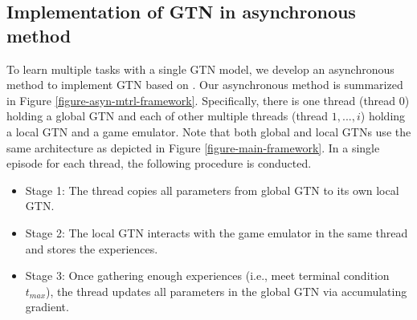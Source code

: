 \documentclass[letterpaper]{article} %
\begin{document}
\subsection{Implementation of GTN in asynchronous method}
\label{section-asyn-mtrl-framework}


To learn multiple tasks with a single GTN model, we develop an asynchronous method to implement GTN based on \cite{mnih2016asynchronous}.
Our asynchronous method is summarized in Figure \ref{figure-asyn-mtrl-framework}.
Specifically, there is one thread (thread $0$) holding a global GTN and each of other multiple threads (thread $1,..., i$) holding a local GTN and a game emulator.
Note that both global and local GTNs use the same architecture as depicted in Figure \ref{figure-main-framework}.
In a single episode for each thread, the following procedure is conducted.
\begin{itemize}
    \item  Stage 1: The thread copies all parameters from global GTN to its own local GTN.
    \item  Stage 2:  The local GTN interacts with the game emulator in the same thread and stores the experiences.
    \item  Stage 3:  Once gathering enough experiences (i.e., meet terminal condition $t_{max}$), the thread updates all parameters in the global GTN via accumulating gradient.
\end{itemize}
\end{document}
